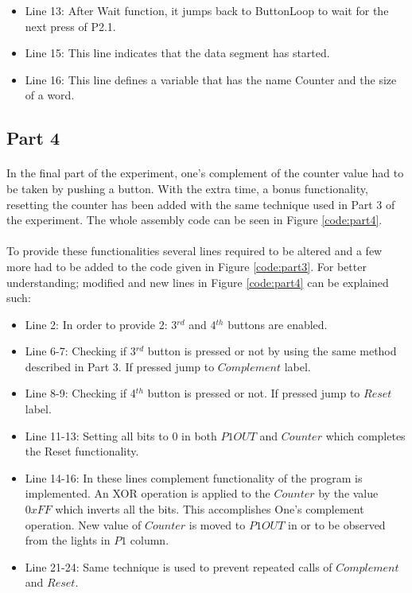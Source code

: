 \documentclass[pdftex,12pt,a4paper]{article}
\begin{document}
\begin{itemize}
\item Line 13: After Wait function, it jumps back to ButtonLoop to wait for the next press of P2.1.

\item Line 15: This line indicates that the data segment has started.

\item Line 16: This line defines a variable that has the name Counter and the size of a word.
\end{itemize}

\subsection{Part 4}

\paragraph{}
In the final part of the experiment, one's complement of the counter value had to be taken by pushing a button. With the extra time, a bonus functionality, resetting the counter has been added with the same technique used in Part 3 of the experiment. The whole assembly code can be seen in Figure \ref{code:part4}.
\paragraph{}
To provide these functionalities several lines required to be altered and a few more had to be added to the code given in Figure \ref{code:part3}. For better understanding; modified and new lines in Figure \ref{code:part4} can be explained such:
\begin{itemize}
    \item Line 2: In order to provide 2: 3$^{rd}$ and 4$^{th}$ buttons are enabled.
    \item Line 6-7: Checking if 3$^{rd}$ button is pressed or not by using the same method described in Part 3. If pressed jump to $Complement$ label.
    \item Line 8-9: Checking if 4$^{th}$ button is pressed or not. If pressed jump to $Reset$ label.
    \item Line 11-13: Setting all bits to 0 in both $P1OUT$ and $Counter$ which completes the Reset functionality.
    \item Line 14-16: In these lines complement functionality of the program is implemented. An XOR operation is applied to the $Counter$ by the value $0xFF$ which inverts all the bits. This accomplishes One's complement operation. New value of $Counter$ is moved to $P1OUT$ in or to be observed from the lights in $P1$ column.
    \item Line 21-24: Same technique is used to prevent repeated calls of $Complement$ and $Reset$.
\end{itemize}
\end{document}

